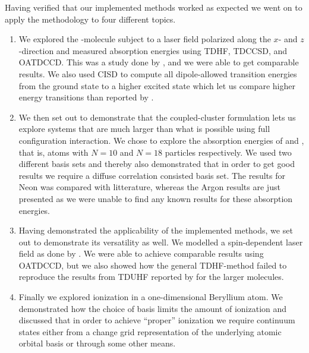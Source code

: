     Having verified that our implemented methods worked as expected we went on
    to apply the methodology to four different topics.
    \begin{enumerate}
        \item We explored the -molecule subject to a laser field
            polarized along the $x$- and $z$-direction and measured absorption
            energies using TDHF, TDCCSD, and OATDCCD.
            This was a study done by \citeauthor{nest} \cite{nest}, and we were
            able to get comparable results.
            We also used CISD to compute all dipole-allowed transition energies
            from the ground state to a higher excited state which let us compare
            higher energy transitions than reported by \citeauthor{nest}.
        \item We then set out to demonstrate that the coupled-cluster
            formulation lets us explore systems that are much larger than what
            is possible using full configuration interaction.
            We chose to explore the absorption energies of  and ,
            that is, atoms with $N = 10$ and $N = 18$ particles respectively.
            We used two different basis sets and thereby also demonstrated that
            in order to get good results we require a diffuse correlation
            consisted basis set.
            The results for Neon was compared with litterature, whereas the
            Argon results are just presented as we were unable to find any known
            results for these absorption energies.
        \item Having demonstrated the applicability of the implemented methods,
            we set out to demonstrate its versatility as well.
            We modelled a spin-dependent laser field as done by
            \citeauthor{isborn} \cite{isborn}.
            We were able to achieve comparable results using OATDCCD, but we
            also showed how the general TDHF-method failed to reproduce the
            results from TDUHF reported by \citeauthor{isborn} for the larger
            molecules.
        \item Finally we explored ionization in a one-dimensional Beryllium
            atom.
            We demonstrated how the choice of basis limits the amount of
            ionization and discussed that in order to achieve ``proper''
            ionization we require continuum states either from a change grid
            representation of the underlying atomic orbital basis or through
            some other means.
    \end{enumerate}
